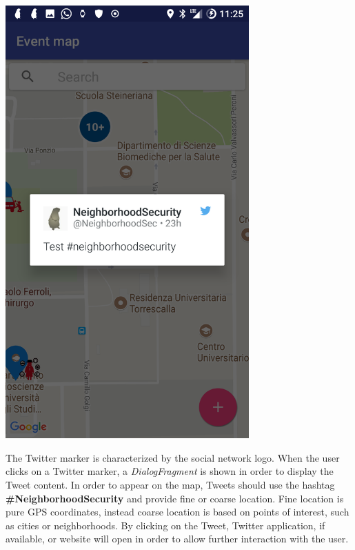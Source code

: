 \documentclass[a4paper]{scrreprt}
\begin{document}
\begin{minipage}{0.5\textwidth}
	\centering
	\includegraphics[width=0.7\textwidth]{imgs/twitter}
\end{minipage}
\begin{minipage}{0.5\textwidth}
	The Twitter marker is characterized by the social network logo. When the user clicks on a Twitter marker, a \textit{DialogFragment} is shown in order to display the Tweet content. In order to appear on the map, Tweets should use the hashtag \textbf{\#NeighborhoodSecurity} and provide fine or coarse location. Fine location is pure GPS coordinates, instead coarse location is based on points of interest, such as cities or neighborhoods. By clicking on the Tweet, Twitter application, if available, or website will open in order to allow further interaction with the user.
\end{minipage}
\end{document}
